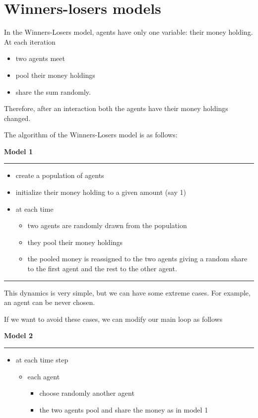 \documentclass{article}
\providecommand{\tightlist}{%
  \setlength{\itemsep}{0pt}\setlength{\parskip}{0pt}}
\begin{document}
\section{Winners-losers models}
In the Winners-Losers model, agents have only one variable: their money holding. At each iteration
\begin{itemize}
		\tightlist
	\item two agents meet
	\item pool their money holdings
	\item share the sum randomly.  
\end{itemize}
Therefore, after an interaction both the agents have their money holdings changed.

The algorithm of the Winners-Losers model is as follows:

\vskip2mm
\noindent\textbf{Model 1}
\vskip1mm
\hrule

\begin{itemize}
\tightlist
\item
  create a population of agents
\item
  initialize their money holding to a given amount (say 1)
\item
  at each time

  \begin{itemize}
  \tightlist
  \item
    two agents are randomly drawn from the population
  \item
    they pool their money holdings
  \item
    the pooled money is reassigned to the two agents giving a random
    share to the first agent and the rest to the other agent.
  \end{itemize}
\end{itemize}
\vskip-2mm
\hrule

\vskip4mm
This dynamics is very simple, but we can have some extreme cases. For
example, an agent can be never chosen.

If we want to avoid these cases, we can modify our main loop as follows

\vskip2mm
\noindent\textbf{Model 2}
\vskip1mm
\hrule

\begin{itemize}
\tightlist
\item
  at each time step

  \begin{itemize}
  \tightlist
  \item
    each agent

    \begin{itemize}
    \tightlist
    \item
      choose randomly another agent
    \item
      the two agents pool and share the money as in model 1
    \end{itemize}
  \end{itemize}
\end{itemize}
\end{document}
